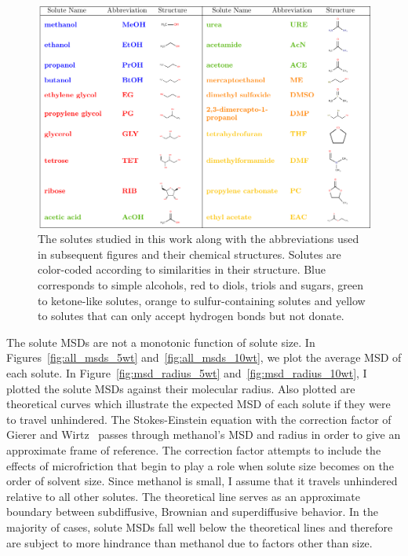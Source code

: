 \documentclass{article}
\begin{document}
  \begin{figure}
  \includegraphics[width=\textwidth]{solute_table.pdf}
  \caption{The solutes studied in this work along with the abbreviations used
  in subsequent figures and their chemical structures. Solutes are color-coded
  according to similarities in their structure. Blue corresponds to simple 
  alcohols, red to diols, triols and sugars, green to ketone-like solutes, 
  orange to sulfur-containing solutes and yellow to solutes that can only accept
  hydrogen bonds but not donate.}\label{fig:solute_table}
  \vspace{-0.5cm}
  \end{figure}
  
  The solute MSDs are not a monotonic function of solute size. In 
  Figures~\ref{fig:all_msds_5wt} and~\ref{fig:all_msds_10wt}, we plot
  the average MSD of each solute. In Figure~\ref{fig:msd_radius_5wt} 
  and~\ref{fig:msd_radius_10wt}, I plotted the solute MSDs against their
  molecular radius. Also plotted are theoretical curves which illustrate the 
  expected MSD of each solute if they were to travel unhindered. The 
  Stokes-Einstein equation with the correction factor of Gierer and 
  Wirtz~\cite{gierer_molekulare_1953} passes through methanol's MSD and
  radius in order to give an approximate frame of reference. The correction 
  factor attempts to include the effects of microfriction that begin to 
  play a role when solute size becomes on the order of solvent size. 
  Since methanol is small, I assume that it travels unhindered relative 
  to all other solutes. The theoretical line serves as an approximate 
  boundary between subdiffusive, Brownian and superdiffusive behavior.
  In the majority of cases, solute MSDs fall well below the theoretical
  lines and therefore are subject to more hindrance than methanol due to
  factors other than size.
\end{document}
